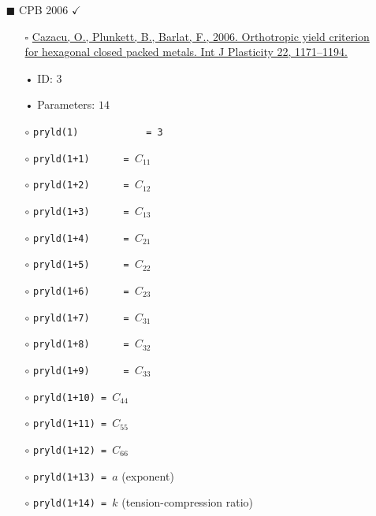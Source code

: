 \documentclass[11pt,a4paper,twoside,final,onecolumn,titlepage]{article}
\newcommand{\verified}{\hspace{0.5pt} {\LARGE $\checkmark$}}
\begin{document}
\newpage
\begin{itemize}
	\item[\tiny$\blacksquare$] CPB 2006 \verified{}
	\begin{itemize}
		\item[\tiny$\square$] {\small \href{https://doi.org/10.1016/j.ijplas.2005.06.001}{Cazacu, O., Plunkett, B., Barlat, F., 2006. Orthotropic yield criterion for hexagonal closed packed metals. Int J Plasticity 22, 1171–1194.}}\\
		\item[•] ID: $3$
		\item[•] Parameters: $14$\\
		\item[$\circ$] \texttt{pryld(1)\,\,\,\,\,\,\,\,\,\,\,\,= 3}
		\item[$\circ$] \texttt{pryld(1+1)\,\,\,\,\,\,= $C_{11}$}
		\item[$\circ$] \texttt{pryld(1+2)\,\,\,\,\,\,= $C_{12}$}
		\item[$\circ$] \texttt{pryld(1+3)\,\,\,\,\,\,= $C_{13}$}
		\item[$\circ$] \texttt{pryld(1+4)\,\,\,\,\,\,= $C_{21}$}
		\item[$\circ$] \texttt{pryld(1+5)\,\,\,\,\,\,= $C_{22}$}
		\item[$\circ$] \texttt{pryld(1+6)\,\,\,\,\,\,= $C_{23}$}
		\item[$\circ$] \texttt{pryld(1+7)\,\,\,\,\,\,= $C_{31}$}
		\item[$\circ$] \texttt{pryld(1+8)\,\,\,\,\,\,= $C_{32}$}
		\item[$\circ$] \texttt{pryld(1+9)\,\,\,\,\,\,= $C_{33}$}
		\item[$\circ$] \texttt{pryld(1+10) = $C_{44}$}
		\item[$\circ$] \texttt{pryld(1+11) = $C_{55}$}
		\item[$\circ$] \texttt{pryld(1+12) = $C_{66}$}
		\item[$\circ$] \texttt{pryld(1+13) = $a$} (exponent) 
		\item[$\circ$] \texttt{pryld(1+14) = $k$} (tension-compression ratio)\\
	\end{itemize}
\end{itemize}
\end{document}
